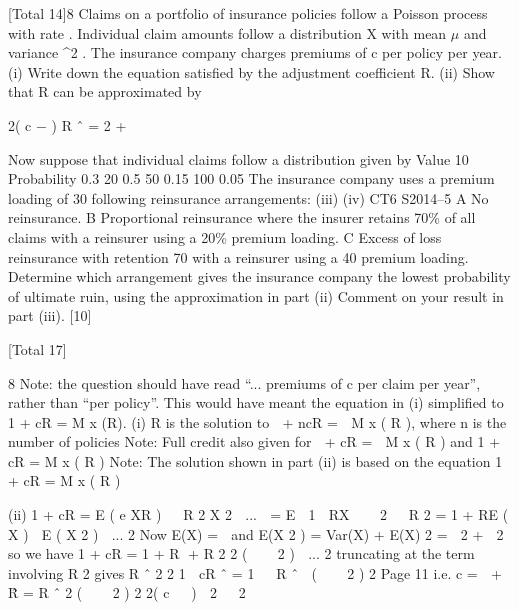 \documentclass[a4paper,12pt]{article}
\begin{document}
\begin{enumerate}

[Total 14]8
Claims on a portfolio of insurance policies follow a Poisson process with rate \lambda.
Individual claim amounts follow a distribution X with mean $\mu$   and variance \sigma^{2} . The
insurance company charges premiums of c per policy per year.
(i) Write down the equation satisfied by the adjustment coefficient R.
(ii) Show that R can be approximated by

2( c − \mu   )
R ˆ = 2
\sigma   + 

Now suppose that individual claims follow a distribution given by
Value
10
Probability 0.3
20
0.5
50
0.15
100
0.05
The insurance company uses a premium loading of 30%
following reinsurance arrangements:
(iii)
(iv)
CT6 S2014–5
A No reinsurance.
B Proportional reinsurance where the insurer retains 70\% of all claims with
a reinsurer using a 20\% premium loading.
C Excess of loss reinsurance with retention 70 with a reinsurer using a 40%
premium loading.
Determine which arrangement gives the insurance company the lowest
probability of ultimate ruin, using the approximation in part (ii)
Comment on your result in part (iii).
[10]

[Total 17]


8
Note: the question should have read “... premiums of c per claim per year”, rather
than “per policy”. This would have meant the equation in (i) simplified to
1 + cR = M x (R).
(i)
R is the solution to
 + ncR =  M x ( R ), where n is the number of policies
Note: Full credit also given for  + cR =  M x ( R ) and 1 + cR = M x ( R )
Note: The solution shown in part (ii) is based on the equation 1 + cR = M x ( R )

(ii)
1 + cR = E ( e XR )


R 2 X 2
 ... 
= E  1  RX 


2


R 2
= 1 + RE ( X ) 
E ( X 2 )  ...
2
Now E(X) = 
and E(X 2 ) = Var(X) + E(X) 2 =  2 +  2 so we have
1 + cR = 1 + R +
R 2 2
(    2 )  ...
2
truncating at the term involving R 2 gives
R ˆ 2 2
1  cR ˆ = 1   R ˆ 
(    2 )
2
Page 11%
i.e. c =  +
R̂ =
R ˆ 2
(    2 )
2
2( c   )
 2   2


\end{enumerate}
\end{document}
